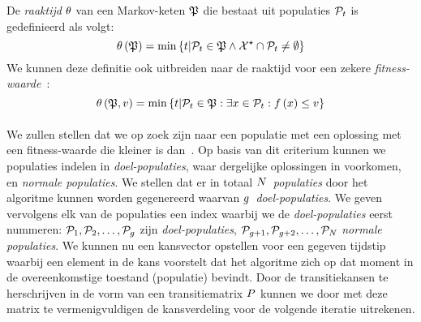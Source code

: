 \begin{definition}
De \emph{raaktijd} $\theta$ van een Markov-keten $\mathfrak{P}$ die bestaat uit populaties $\mathcal{P}_t$ is gedefinieerd als volgt:
\begin{equation}
\theta\left(\mathfrak{P}\right)=\min\left\{ t|\mathcal{P}_t\in\mathfrak{P}\wedge\mathcal{X}^{\star}\cap \mathcal{P}_t\neq\emptyset\right\}
\end{equation}
We kunnen deze definitie ook uitbreiden naar de raaktijd voor een zekere \emph{fitness-waarde}~\fitnessval:
\begin{equation}
\theta\left(\mathfrak{P},v\right)=\min\left\{ t|\mathcal{P}_t\in\mathfrak{P}:\exists x\in \mathcal{P}_t:f\left(x\right)\leq v\right\}
\end{equation}
\end{definition}

\paragraph{}
We zullen stellen dat we op zoek zijn naar een populatie met een oplossing met een fitness-waarde die kleiner is dan~\fitnessval. Op basis van dit criterium kunnen we populaties indelen in \emph{doel-populaties}, waar dergelijke oplossingen in voorkomen, en \emph{normale populaties}. We stellen dat er in totaal $N$~\emph{populaties} door het algoritme kunnen worden gegenereerd waarvan $g$~\emph{doel-populaties}. We geven vervolgens elk van de populaties een index waarbij we de \emph{doel-populaties} eerst nummeren: $\mathcal{P}_1,\mathcal{P}_2,\ldots,\mathcal{P}_{g}$ zijn \emph{doel-populaties}, $\mathcal{P}_{g+1},\mathcal{P}_{g+2},\ldots,\mathcal{P}_{N}$ \emph{normale populaties}. We kunnen nu een kansvector  opstellen voor een gegeven tijdstip waarbij een element in  de kans voorstelt dat het algoritme zich op dat moment in de overeenkomstige toestand (populatie) bevindt. Door de transitiekansen te herschrijven in de vorm van een transitiematrix $P$ kunnen we door  met deze matrix te vermenigvuldigen de kansverdeling voor de volgende iteratie uitrekenen.


